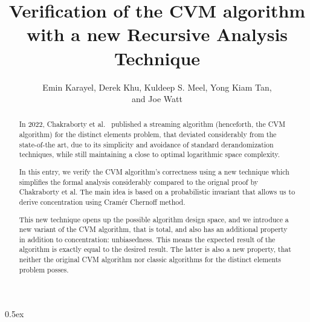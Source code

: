 \documentclass[11pt,a4paper]{article}
\theoremstyle{definition}
\begin{document}
\title{Verification of the CVM algorithm with a new Recursive Analysis Technique}
\author{Emin Karayel, Derek Khu, Kuldeep S. Meel, Yong Kiam Tan,\\and Joe Watt}
\maketitle

\begin{abstract}
In 2022, Chakraborty et al.~\cite{chakraborty2022} published a streaming 
algorithm (henceforth, the CVM algorithm) for the distinct
elements problem, that deviated considerably from the state-of-the art, due to its simplicity
and avoidance of standard derandomization techniques, while still maintaining a close to optimal
logarithmic space complexity.

In this entry, we verify the CVM algorithm's correctness using a new technique which simplifies
the formal analysis considerably compared to the orignal proof by Chakraborty et
al. The main idea is based on a probabilistic invariant that allows us to derive concentration using
Cram\'{e}r Chernoff method.

This new technique opens up the possible algorithm design space, and we introduce a new variant of the 
CVM algorithm, that is total, and also has an additional property in addition 
to concentration: unbiasedness. This means the expected result of the algorithm is exactly equal to
the desired result. The latter is also a new property, that neither the original CVM algorithm
nor classic algorithms for the distinct elements problem posses.
\end{abstract}

\tableofcontents

\parindent 0pt\parskip 0.5ex






\appendix

\end{document}
